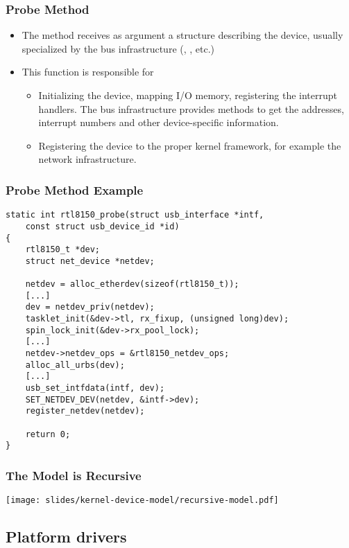 \begin{frame}
  \frametitle{Probe Method}
  \begin{itemize}
  \item The  method receives as argument a structure
    describing the device, usually specialized by the bus
    infrastructure (, , etc.)
  \item This function is responsible for
    \begin{itemize}
    \item Initializing the device, mapping I/O memory, registering the
      interrupt handlers. The bus infrastructure provides methods to
      get the addresses, interrupt numbers and other device-specific
      information.
    \item Registering the device to the proper kernel framework, for
      example the network infrastructure.
    \end{itemize}
  \end{itemize}
\end{frame}

\begin{frame}[fragile]
\frametitle{Probe Method Example}
\begin{block}{}
\begin{verbatim}
static int rtl8150_probe(struct usb_interface *intf,
    const struct usb_device_id *id)
{
    rtl8150_t *dev;
    struct net_device *netdev;

    netdev = alloc_etherdev(sizeof(rtl8150_t));
    [...]
    dev = netdev_priv(netdev);
    tasklet_init(&dev->tl, rx_fixup, (unsigned long)dev);
    spin_lock_init(&dev->rx_pool_lock);
    [...]
    netdev->netdev_ops = &rtl8150_netdev_ops;
    alloc_all_urbs(dev);
    [...]
    usb_set_intfdata(intf, dev);
    SET_NETDEV_DEV(netdev, &intf->dev);
    register_netdev(netdev);

    return 0;
}
\end{verbatim}
\end{block}
\end{frame}

\begin{frame}
  \frametitle{The Model is Recursive}
  \begin{center}
    \texttt{[image: slides/kernel-device-model/recursive-model.pdf]}
  \end{center}
\end{frame}

\subsection{Platform drivers}

